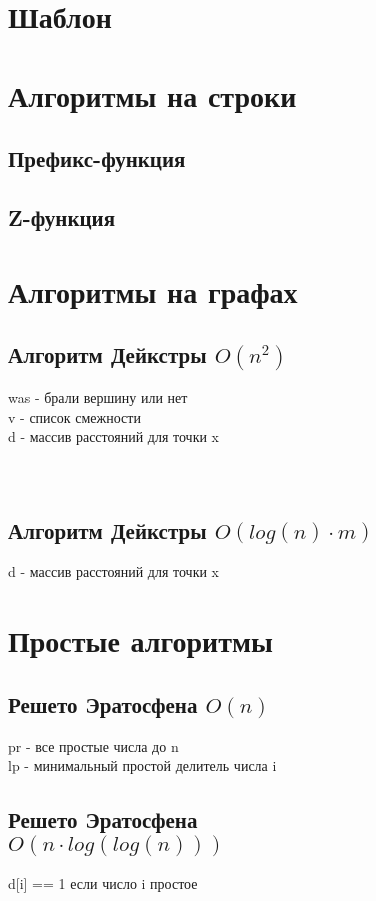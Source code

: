 \documentclass[a4paper]{article}
\begin{document}
	\begin{multicols*}{2}
		\section{Шаблон}
		
		\section{Алгоритмы на строки}
		\subsection{Префикс-функция}
		
		\subsection{Z-функция}
		
		\section{Алгоритмы на графах}
		\subsection{Алгоритм Дейкстры $O(n^2)$}
		was - брали вершину или нет \\
		v - список смежности \\
		d - массив расстояний для точки x
		\\
		\\
		\\
		
		\subsection{Алгоритм Дейкстры $O(log(n) \cdot m)$}
		d - массив расстояний для точки x
		
		\section{Простые алгоритмы}
		\subsection{Решето Эратосфена $O(n)$}
		pr - все простые числа до n \\
		lp - минимальный простой делитель числа i
		
		\subsection{Решето Эратосфена \\ $O(n \cdot log(log(n)))$}
		d[i] == 1 если число i простое
		
		

\end{multicols*}
\end{document}
